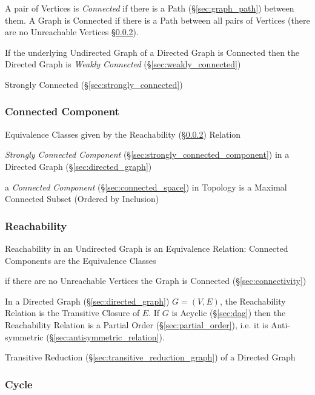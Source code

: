 A pair of Vertices is \emph{Connected} if there is a Path
(\S\ref{sec:graph_path}) between them. A Graph is Connected if there
is a Path between all pairs of Vertices (there are no Unreachable
Vertices \S\ref{sec:reachability}).

If the underlying Undirected Graph of a Directed Graph is Connected
then the Directed Graph is \emph{Weakly Connected}
(\S\ref{sec:weakly_connected})

Strongly Connected (\S\ref{sec:strongly_connected})



\subsubsection{Connected Component}\label{sec:connected_component}

Equivalence Classes given by the Reachability
(\S\ref{sec:reachability}) Relation

\emph{Strongly Connected Component}
(\S\ref{sec:strongly_connected_component}) in a Directed Graph
(\S\ref{sec:directed_graph})

\fist a \emph{Connected Component} (\S\ref{sec:connected_space}) in Topology is
a Maximal Connected Subset (Ordered by Inclusion)



\subsubsection{Reachability}\label{sec:reachability}

Reachability in an Undirected Graph is an Equivalence Relation:
Connected Components are the Equivalence Classes

if there are no Unreachable Vertices the Graph is Connected
(\S\ref{sec:connectivity})

In a Directed Graph (\S\ref{sec:directed_graph}) $G = (V,E)$, the
Reachability Relation is the Transitive Closure of $E$. If $G$ is
Acyclic (\S\ref{sec:dag}) then the Reachability Relation is a Partial
Order (\S\ref{sec:partial_order}), i.e. it is Anti-symmetric
(\S\ref{sec:antisymmetric_relation}).

Transitive Reduction (\S\ref{sec:transitive_reduction_graph}) of a
Directed Graph



\subsubsection{Cycle}\label{sec:cycle}

